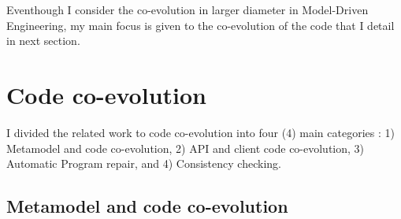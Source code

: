 Eventhough I consider the co-evolution in larger diameter in Model-Driven Engineering, my main focus is given to the co-evolution of the code that I detail in next section.


 \section{Code co-evolution}
 \label{coevolutioncode}
 I divided the related work to code co-evolution  into four (4) main categories : 1) Metamodel and code co-evolution, 2) API and client code co-evolution, 3) Automatic Program repair, and 4) Consistency checking. 
 \subsection{Metamodel and code co-evolution}
 
